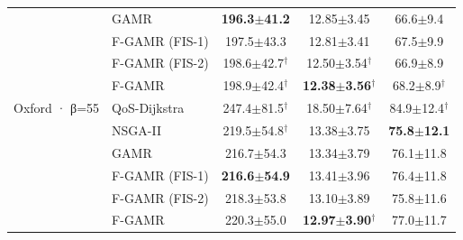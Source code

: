\begin{table}[t]
\begin{tabular}{llccc}
 & GAMR & \textbf{196.3$\pm$41.2} & 12.85$\pm$3.45 & 66.6$\pm$9.4 \\
 & F-GAMR (FIS-1) & 197.5$\pm$43.3 & 12.81$\pm$3.41 & 67.5$\pm$9.9 \\
 & F-GAMR (FIS-2) & 198.6$\pm$42.7$^\dagger$ & 12.50$\pm$3.54$^\dagger$ & 66.9$\pm$8.9 \\
 & F-GAMR & 198.9$\pm$42.4$^\dagger$ & \textbf{12.38$\pm$3.56}$^\dagger$ & 68.2$\pm$8.9$^\dagger$ \\
\midrule
Oxford · β=55%
 & QoS-Dijkstra & 247.4$\pm$81.5$^\dagger$ & 18.50$\pm$7.64$^\dagger$ & 84.9$\pm$12.4$^\dagger$ \\
 & NSGA-II & 219.5$\pm$54.8$^\dagger$ & 13.38$\pm$3.75 & \textbf{75.8$\pm$12.1} \\
 & GAMR & 216.7$\pm$54.3 & 13.34$\pm$3.79 & 76.1$\pm$11.8 \\
 & F-GAMR (FIS-1) & \textbf{216.6$\pm$54.9} & 13.41$\pm$3.96 & 76.4$\pm$11.8 \\
 & F-GAMR (FIS-2) & 218.3$\pm$53.8 & 13.10$\pm$3.89 & 75.8$\pm$11.6 \\
 & F-GAMR & 220.3$\pm$55.0 & \textbf{12.97$\pm$3.90}$^\dagger$ & 77.0$\pm$11.7 \\
\bottomrule
\end{tabular}
\end{table}